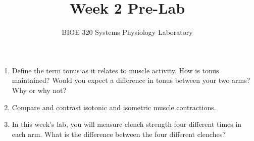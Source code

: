 \documentclass{article}
\title{Week 2 Pre-Lab}
\author{BIOE 320 Systems Physiology Laboratory}
\date{}
\begin{document}
\maketitle
\large

\begin{enumerate}
	\item Define the term tonus as it relates to muscle activity. How is tonus maintained? Would you expect a difference in tonus between your two arms? Why or why not?
	\item Compare and contrast isotonic and isometric muscle contractions.
	\item In this week's lab, you will measure clench strength four different times in each arm. What is the difference between the four different clenches?
\end{enumerate}
\end{document}
